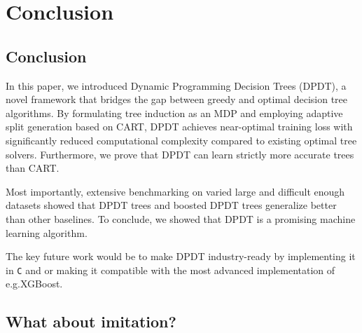 \chapter{Conclusion}
\section{Conclusion}

In this paper, we introduced Dynamic Programming Decision Trees (DPDT), a novel framework that bridges the gap between greedy and optimal decision tree algorithms. By formulating tree induction as an MDP and employing adaptive split generation based on CART, DPDT achieves near-optimal training loss with significantly reduced computational complexity compared to existing optimal tree solvers. Furthermore, we prove that DPDT can learn strictly more accurate trees than CART. 

Most importantly, extensive benchmarking on varied large and difficult enough datasets showed that DPDT trees and boosted DPDT trees generalize better than other baselines. To conclude, we showed that DPDT is a promising machine learning algorithm. 

The key future work would be to make DPDT industry-ready by implementing it in \texttt{C} and or making it compatible with the most advanced implementation of e.g.\@ XGBoost.

\section{What about imitation?}